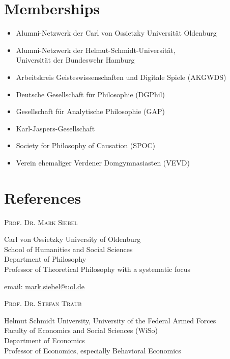 \documentclass[a4paper,10pt]{article}
\begin{document}
\clearpage
\section{Memberships}
\begin{itemize}
   \item Alumni-Netzwerk der Carl von Ossietzky Universität Oldenburg
   \item Alumni-Netzwerk der Helmut-Schmidt-Universität,\\Universität der Bundeswehr Hamburg
   \item Arbeitskreis Geisteswissenschaften und Digitale Spiele (AKGWDS)
   \item Deutsche Gesellschaft für Philosophie (DGPhil)
   \item Gesellschaft für Analytische Philosophie (GAP)
   \item Karl-Jaspers-Gesellschaft
   \item Society for Philosophy of Causation (SPOC)
   \item Verein ehemaliger Verdener Domgymnasiasten (VEVD)
\end{itemize}


\clearpage
\section{References}
\textsc{Prof\hspace{0.5pt}. Dr\hspace{0.5pt}. Mark Siebel}

Carl von Ossietzky University of Oldenburg\\
School of Humanities and Social Sciences\\
Department of Philosophy\\
Professor of Theoretical Philosophy with a systematic focus

email: \href{mailto:mark.siebel@uol.de}{mark.siebel@uol.de}\vspace{12pt}

\textsc{Prof\hspace{0.5pt}. Dr\hspace{0.5pt}. Stefan Traub}

Helmut Schmidt University, University of the Federal Armed Forces\\
Faculty of Economics and Social Sciences (WiSo)\\
Department of Economics\\
Professor of Economics, especially Behavioral Economics
\end{document}
